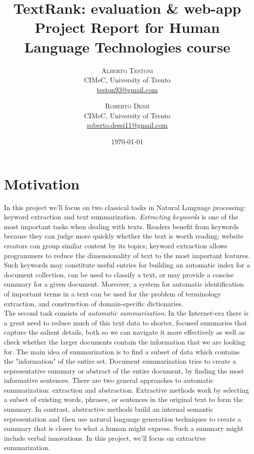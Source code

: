 \documentclass[twoside,twocolumn]{article}
\title{TextRank: evaluation \& web-app \\
\large Project Report for Human Language Technologies course } %
\author{%
	\textsc{Alberto Testoni }\\ [1ex]%
\normalsize CIMeC, University of Trento \\ %
\normalsize \href{mailto:teston93@gmail.com}{teston93@gmail.com} %
\and %
\textsc{Roberto Dess\'{i} } \\[1ex] %
\normalsize  CIMeC, University of Trento\\ %
\normalsize \href{mailto:roberto.dessi11@gmail.com}{roberto.dessi11@gmail.com} %
}
\date{\today} %
\begin{document}
\maketitle


\section{Motivation}
In this project we'll focus on two classical tasks in Natural Language processing: keyword extraction and text summarization. \textit{Extracting keywords} is one of the most important tasks when dealing with texts. Readers benefit from keywords because they can judge more quickly whether the text is worth reading; website creators can group similar content by its topics; keyword extraction allows programmers to reduce the dimensionality of text to the most important features. Such keywords may constitute useful entries for building an automatic index for a document collection, can be used to classify a text, or may provide a concise summary for a given document. Moreover, a system for automatic identification of important terms in a text can be used for the problem of terminology extraction, and construction of domain-specific dictionaries.\\
The second task consists of \textit{automatic summarization}. In the Internet-era there is a great need to reduce much of this text data to shorter, focused summaries that capture the salient details, both so we can navigate it more effectively as well as check whether the larger documents contain the information that we are looking for. The main idea of summarization is to find a subset of data which contains the "information" of the entire set. Document summarization tries to create a representative summary or abstract of the entire document, by finding the most informative sentences. There are two general approaches to automatic summarization: extraction and abstraction. Extractive methods work by selecting a subset of existing words, phrases, or sentences in the original text to form the summary. In contrast, abstractive methods build an internal semantic representation and then use natural language generation techniques to create a summary that is closer to what a human might express. Such a summary might include verbal innovations. In this project, we'll focus on extractive summarization. 
\end{document}
